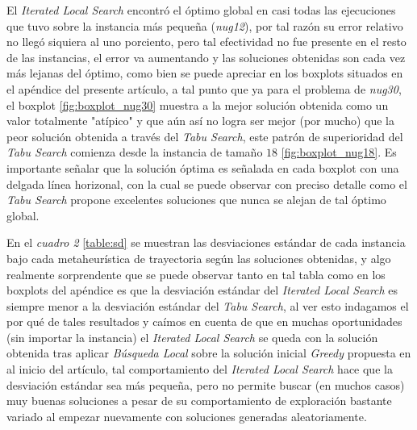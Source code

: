 \documentclass{ci5652}
\begin{document}
El \textit{Iterated Local Search} encontró el óptimo global en casi todas las ejecuciones que tuvo sobre la instancia más pequeña (\textit{nug12}), por tal razón su error relativo no llegó siquiera al uno porciento, pero tal efectividad no fue presente en el resto de las instancias, el error va aumentando y las soluciones obtenidas son cada vez más lejanas del óptimo, como bien se puede apreciar en los boxplots situados en el apéndice del presente artículo, a tal punto que ya para el problema de \textit{nug30}, el boxplot \ref{fig:boxplot_nug30} muestra a la mejor solución obtenida como un valor totalmente "atípico" y que aún así no logra ser mejor (por mucho) que la peor solución obtenida a través del \textit{Tabu Search}, este patrón de superioridad del \textit{Tabu Search} comienza desde la instancia de tamaño \(18\) \ref{fig:boxplot_nug18}. Es importante señalar que la solución óptima es señalada en cada boxplot con una delgada línea horizonal, con la cual se puede observar con preciso detalle como el \textit{Tabu Search} propone excelentes soluciones que nunca se alejan de tal óptimo global.

En el \textit{cuadro 2} \ref{table:sd} se muestran las desviaciones estándar de cada instancia bajo cada metaheurística de trayectoria según las soluciones obtenidas, y algo realmente sorprendente que se puede observar tanto en tal tabla como en los boxplots del apéndice es que la desviación estándar del \textit{Iterated Local Search} es siempre menor a la desviación estándar del \textit{Tabu Search}, al ver esto indagamos el por qué de tales resultados y caímos en cuenta de que en muchas oportunidades (sin importar la instancia) el \textit{Iterated Local Search} se queda con la solución obtenida tras aplicar \textit{Búsqueda Local} sobre la solución inicial \textit{Greedy} propuesta en al inicio del artículo, tal comportamiento del \textit{Iterated Local Search} hace que la desviación estándar sea más pequeña, pero no permite buscar (en muchos casos) muy buenas soluciones a pesar de su comportamiento de exploración bastante variado al empezar nuevamente con soluciones generadas aleatoriamente.
\end{document}
